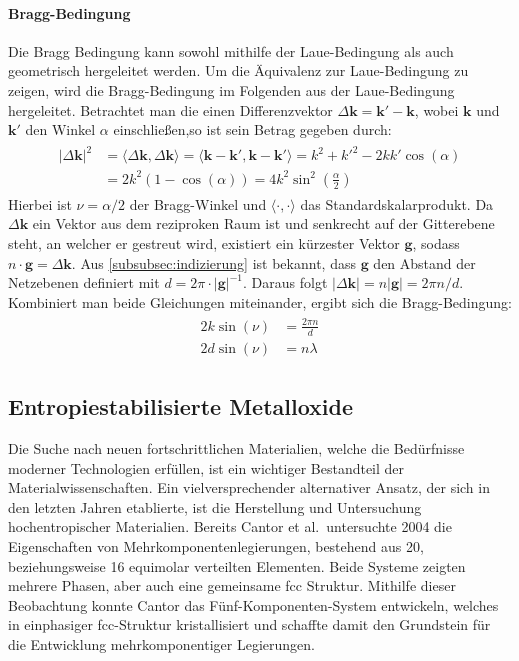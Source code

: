 \paragraph{Bragg-Bedingung}
Die Bragg Bedingung kann sowohl mithilfe der Laue-Bedingung als auch geometrisch hergeleitet werden.
Um die Äquivalenz zur Laue-Bedingung zu zeigen, wird die Bragg-Bedingung im Folgenden aus der Laue-Bedingung
hergeleitet.
Betrachtet man die einen Differenzvektor $\Delta \mathbf{k}=\mathbf{k}'-\mathbf{k}$, wobei $\mathbf{k}$ und
$\mathbf{k'}$ den Winkel $\alpha$ einschließen,so ist sein Betrag gegeben durch:
\begin{align}
    \begin{split}
        \lvert \Delta \mathbf{k} \rvert ^{2}&=\langle \Delta \mathbf{k} ,\Delta \mathbf{k}\rangle =\langle
        \mathbf{k}-\mathbf{k}', \mathbf{k}-\mathbf{k}' \rangle = k^{2}+k'^{2}-2kk'\cos(\alpha)  \\
        &=2{k}^{2}(1-\cos(\alpha))=4k^{2}\sin ^{2}\left( \frac{\alpha}{2} \right)
    \end{split}
\end{align}
Hierbei ist $\nu = \alpha / 2$ der Bragg-Winkel und $\langle \cdot , \cdot \rangle$ das Standardskalarprodukt.
Da $\Delta \mathbf{k}$ ein Vektor aus dem reziproken Raum ist und senkrecht auf der Gitterebene
steht, an welcher er gestreut wird, existiert ein kürzester Vektor $\mathbf{g}$, sodass
$n\cdot \mathbf{g} =\Delta \mathbf{k}$.
Aus \cref{subsubsec:indizierung} ist bekannt, dass $\mathbf{g}$ den Abstand der Netzebenen definiert
mit $d = 2 \pi \cdot\lvert \mathbf{g} \rvert ^{-1}$.
Daraus folgt $\lvert \Delta \mathbf{k} \rvert=n \lvert \mathbf{g} \rvert = 2\pi n/d$.
Kombiniert man beide Gleichungen miteinander, ergibt sich die Bragg-Bedingung:\autocite[125-126]{Ashcroft}
\begin{align}
    \begin{split}
        2k\sin(\nu)&=\frac{2\pi n}{d} \\
        2d\sin(\nu)&=n \lambda
    \end{split}
\end{align}

\subsection{Entropiestabilisierte Metalloxide}\label{subsec:hochentropische-metalloxide}
Die Suche nach neuen fortschrittlichen Materialien, welche die Bedürfnisse moderner Technologien erfüllen, ist ein
wichtiger Bestandteil der Materialwissenschaften.
Ein vielversprechender alternativer Ansatz, der sich in den letzten Jahren etablierte, ist die Herstellung und
Untersuchung hochentropischer Materialien.
Bereits Cantor et al.\ untersuchte 2004 die Eigenschaften von Mehrkomponentenlegierungen, bestehend aus 20,
beziehungsweise 16 equimolar verteilten Elementen.
Beide Systeme zeigten mehrere Phasen, aber auch eine gemeinsame fcc Struktur.
Mithilfe dieser Beobachtung konnte Cantor das Fünf-Komponenten-System  entwickeln, welches in einphasiger
fcc-Struktur kristallisiert und schaffte damit den Grundstein für
die Entwicklung mehrkomponentiger Legierungen.\autocite{cantor}

